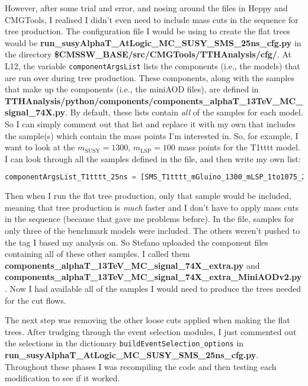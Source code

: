 However, after some trial and error, and nosing around the files in Heppy and CMGTools, I realised I didn't even need to include mass cuts in the sequence for tree production. The configuration file I would be using to create the flat trees would be \textbf{run\_susyAlphaT\_AtLogic\_MC\_SUSY\_SMS\_25ns\_cfg.py} in the directory \textbf{\$CMSSW\_BASE/src/CMGTools/TTHAnalysis/cfg/}. At L12, the variable \texttt{componentArgsList} lists the components (i.e., the models) that are run over during tree production. These components, along with the samples that make up the components (i.e., the miniAOD files), are defined in \textbf{TTHAnalysis/python/components/components\_alphaT\_13TeV\_MC\_signal\_74X.py}. By default, these lists contain \emph{all} of the samples for each model. So I can simply comment out that list and replace it with my own that includes the sample(s) which contain the mass points I'm interested in. So, for example, I want to look at the $m_{\mathrm{SUSY}} = 1300$, $m_{\mathrm{LSP}} = 100$ mass points for the T1tttt model. I can look through all the samples defined in the file, and then write my own list:

\begin{lstlisting}[belowskip=-0.7cm, language=python, numbers=none]
componentArgsList_T1tttt_25ns = [SMS_T1tttt_mGluino_1300_mLSP_1to1075_25ns,]
\end{lstlisting}

Then when I run the flat tree production, only that sample would be included, meaning that tree production is \emph{much} faster and I don't have to apply mass cuts in the sequence (because that gave me problems before). In the file, samples for only three of the benchmark models were included. The others weren't pushed to the tag I based my analysis on. So Stefano uploaded the component files containing all of these other samples. I called them \textbf{components\_alphaT\_13TeV\_MC\_signal\_74X\_extra.py} and \textbf{components\_alphaT\_13TeV\_MC\_signal\_74X\_extra\_MiniAODv2.py}. Now I had available all of the samples I would need to produce the trees needed for the cut flows.

The next step was removing the other loose cuts applied when making the flat trees. After trudging through the event selection modules, I just commented out the selections in the dictionary \texttt{buildEventSelection\_options} in \textbf{run\_susyAlphaT\_AtLogic\_MC\_SUSY\_SMS\_25ns\_cfg.py}. Throughout these phases I was recompiling the code and then testing each modification to see if it worked.

